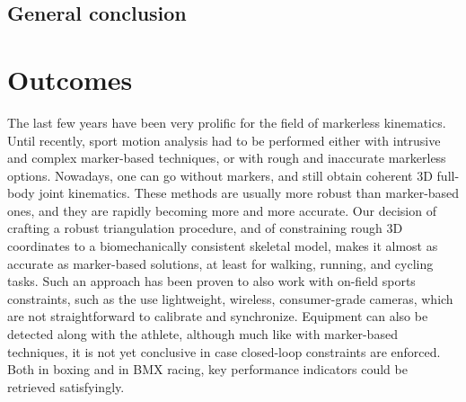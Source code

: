 

{} \mtcaddchapter
{}

\vspace*{-1cm}
\begin{flushright}
\section*{\fontsize{20pt}{20pt}\selectfont\textnormal{General conclusion}}
\end{flushright}
\vspace{2cm}

\chead[\fancyplain{}{}]
      {\fancyplain{}{}}
\lfoot[\fancyplain{}{}]
      {\fancyplain{}{}}
\cfoot[\fancyplain{}{\thepage}]
      {\fancyplain{}{\thepage}}
\rfoot[\fancyplain{}{}]
     {\fancyplain{}{\scriptsize}}


\section*{Outcomes}
The last few years have been very prolific for the field of markerless kinematics. Until recently, sport motion analysis had to be performed either with intrusive and complex marker-based techniques, or with rough and inaccurate markerless options. Nowadays, one can go without markers, and still obtain coherent 3D full-body joint kinematics. These methods are usually more robust than marker-based ones, and they are rapidly becoming more and more accurate. Our decision of crafting a robust triangulation procedure, and of constraining rough 3D coordinates to a biomechanically consistent skeletal model, makes it almost as accurate as marker-based solutions, at least for walking, running, and cycling tasks. Such an approach has been proven to also work with on-field sports constraints, such as the use lightweight, wireless, consumer-grade cameras, which are not straightforward to calibrate and synchronize. Equipment can also be detected along with the athlete, although much like with marker-based techniques, it is not yet conclusive in case closed-loop constraints are enforced. Both in boxing and in BMX racing, key performance indicators could be retrieved satisfyingly. 

